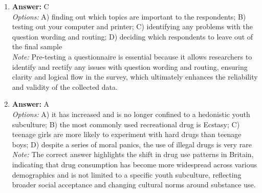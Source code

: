 \documentclass[12pt]{article}
\begin{document}
\begin{enumerate}[label=\arabic*.]
\item \textbf{Answer:} C
\\ \textit{Options:} A) finding out which topics are important to the respondents; B) testing out your computer and printer; C) identifying any problems with the question wording and routing; D) deciding which respondents to leave out of the final sample
\\ \textit{Note:} Pre-testing a questionnaire is essential because it allows researchers to identify and rectify any issues with question wording and routing, ensuring clarity and logical flow in the survey, which ultimately enhances the reliability and validity of the collected data.
\item \textbf{Answer:} A
\\ \textit{Options:} A) it has increased and is no longer confined to a hedonistic youth subculture; B) the most commonly used recreational drug is Ecstasy; C) teenage girls are more likely to experiment with hard drugs than teenage boys; D) despite a series of moral panics, the use of illegal drugs is very rare
\\ \textit{Note:} The correct answer highlights the shift in drug use patterns in Britain, indicating that drug consumption has become more widespread across various demographics and is not limited to a specific youth subculture, reflecting broader social acceptance and changing cultural norms around substance use.
\end{enumerate}
\end{document}
